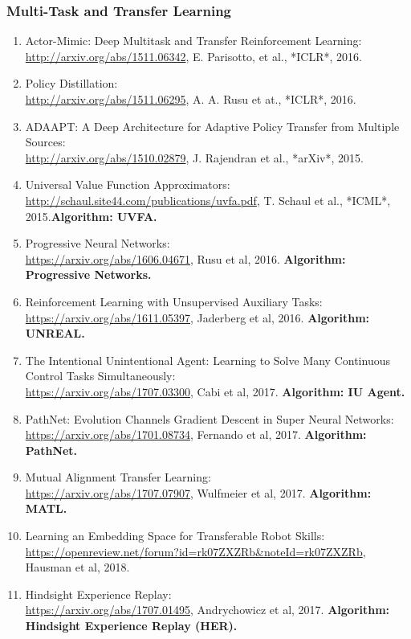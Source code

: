 \documentclass[lang=cn,11pt,a4paper]{elegant_template}
\begin{document}
\subsubsection{Multi-Task and Transfer Learning}
\begin{enumerate}
    \item Actor-Mimic: Deep Multitask and Transfer Reinforcement Learning:\\ \href{http://arxiv.org/abs/1511.06342}{http://arxiv.org/abs/1511.06342}, E. Parisotto, et al., *ICLR*, 2016.
    \item Policy Distillation:\\ \href{http://arxiv.org/abs/1511.06295}{http://arxiv.org/abs/1511.06295}, A. A. Rusu et at., *ICLR*, 2016.
    \item ADAAPT: A Deep Architecture for Adaptive Policy Transfer from Multiple Sources:\\ \href{http://arxiv.org/abs/1510.02879}{http://arxiv.org/abs/1510.02879}, J. Rajendran et al., *arXiv*, 2015.
    \item Universal Value Function Approximators:\\ \href{http://schaul.site44.com/publications/uvfa.pdf}{http://schaul.site44.com/publications/uvfa.pdf}, T. Schaul et al., *ICML*, 2015.\textbf{Algorithm: UVFA.}
    \item Progressive Neural Networks:\\ \href{https://arxiv.org/abs/1606.04671}{https://arxiv.org/abs/1606.04671}, Rusu et al, 2016. \textbf{Algorithm: Progressive Networks.}
    \item Reinforcement Learning with Unsupervised Auxiliary Tasks:\\ \href{https://arxiv.org/abs/1611.05397}{https://arxiv.org/abs/1611.05397}, Jaderberg et al, 2016. \textbf{Algorithm: UNREAL.}
    \item The Intentional Unintentional Agent: Learning to Solve Many Continuous Control Tasks Simultaneously:\\ \href{https://arxiv.org/abs/1707.03300}{https://arxiv.org/abs/1707.03300}, Cabi et al, 2017. \textbf{Algorithm: IU Agent.}
    \item PathNet: Evolution Channels Gradient Descent in Super Neural Networks:\\ \href{https://arxiv.org/abs/1701.08734}{https://arxiv.org/abs/1701.08734}, Fernando et al, 2017. \textbf{Algorithm: PathNet.}
    \item Mutual Alignment Transfer Learning:\\ \href{https://arxiv.org/abs/1707.07907}{https://arxiv.org/abs/1707.07907}, Wulfmeier et al, 2017. \textbf{Algorithm: MATL.}
    \item Learning an Embedding Space for Transferable Robot Skills:\\ \href{https://openreview.net/forum?id=rk07ZXZRb&noteId=rk07ZXZRb}{https://openreview.net/forum?id=rk07ZXZRb\&noteId=rk07ZXZRb}, Hausman et al, 2018.
    \item Hindsight Experience Replay:\\ \href{https://arxiv.org/abs/1707.01495}{https://arxiv.org/abs/1707.01495}, Andrychowicz et al, 2017. \textbf{Algorithm: Hindsight Experience Replay (HER).}
\end{enumerate}
\end{document}
